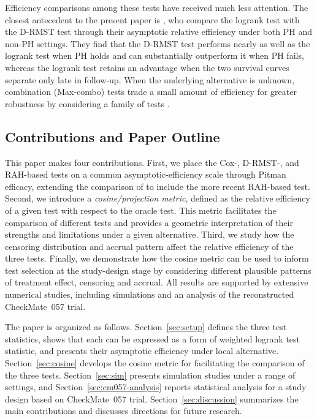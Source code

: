 \documentclass[12pt]{article}
\begin{document}
Efficiency comparisons among these tests have received much less attention. The closest antecedent to the present paper is \citet{Tian2018}, who compare the logrank test with the D-RMST test through their asymptotic relative efficiency under both PH and non-PH settings. They find that the D-RMST test performs nearly as well as the logrank test when PH holds and can substantially outperform it when PH fails, whereas the logrank test retains an advantage when the two survival curves separate only late in follow-up. When the underlying alternative is unknown, combination (Max-combo) tests trade a small amount of efficiency for greater robustness by considering a family of tests \citep{LinEtal2020}.




\subsection{Contributions and Paper Outline}
\label{sec:contributions}

This paper makes four contributions. First, we place the Cox-, D-RMST-, and RAH-based tests on a common asymptotic-efficiency scale through Pitman efficacy, extending the comparison of \citet{Tian2018} to include the more recent RAH-based test. Second, we introduce a \emph{cosine/projection metric}, defined as the relative efficiency of a given test with respect to the oracle test. This metric facilitates the comparison of different tests and provides a geometric interpretation of their strengths and limitations under a given alternative. Third, we study how the censoring distribution and accrual pattern affect the relative efficiency of the three tests. Finally, we demonstrate how the cosine metric can be used to inform test selection at the study-design stage by considering different plausible patterns of treatment effect, censoring and accrual. All results are supported by extensive numerical studies, including simulations and an analysis of the reconstructed CheckMate~057 trial.

The paper is organized as follows. Section~\ref{sec:setup} defines the three test statistics, shows that each can be expressed as a form of weighted logrank test statistic, and presents their asymptotic efficiency under local alternative. Section~\ref{sec:cosine} develops the cosine metric for facilitating the comparison of the three tests. Section~\ref{sec:sim} presents simulation studies under a range of settings, and Section~\ref{sec:cm057-analysis} reports statistical analysis for a study design based on CheckMate~057 trial. Section~\ref{sec:discussion} summarizes the main contributions and discusses directions for future research.
\end{document}
